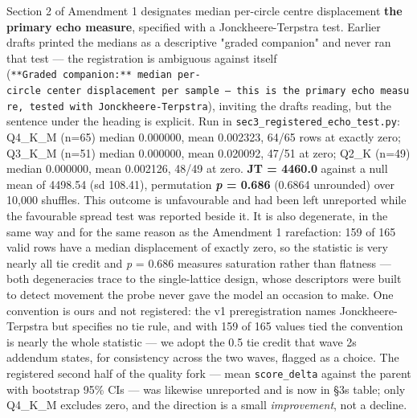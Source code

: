 Section 2 of Amendment 1 designates median per-circle centre displacement \textbf{the primary echo measure}, specified with a Jonckheere-Terpstra test. Earlier drafts printed the medians as a descriptive "graded companion" and never ran that test --- the registration is ambiguous against itself (\texttt{**Graded\ companion:**\ median\ per-circle\ center\ displacement\ per\ sample\ —\ this\ is\ the\ primary\ echo\ measure,\ tested\ with\ Jonckheere-Terpstra}), inviting the drafts\textquotesingle{} reading, but the sentence under the heading is explicit. Run in \texttt{sec3\_registered\_echo\_test.py}: Q4\_K\_M (n=65) median 0.000000, mean 0.002323, 64/65 rows at exactly zero; Q3\_K\_M (n=51) median 0.000000, mean 0.020092, 47/51 at zero; Q2\_K (n=49) median 0.000000, mean 0.002126, 48/49 at zero. \textbf{JT = 4460.0} against a null mean of 4498.54 (sd 108.41), permutation \textbf{\emph{p} = 0.686} (0.6864 unrounded) over 10,000 shuffles. This outcome is unfavourable and had been left unreported while the favourable spread test was reported beside it. It is also degenerate, in the same way and for the same reason as the Amendment 1 rarefaction: 159 of 165 valid rows have a median displacement of exactly zero, so the statistic is very nearly all tie credit and \emph{p} = 0.686 measures saturation rather than flatness --- both degeneracies trace to the single-lattice design, whose descriptors were built to detect movement the probe never gave the model an occasion to make. One convention is ours and not registered: the v1 preregistration names Jonckheere-Terpstra but specifies no tie rule, and with 159 of 165 values tied the convention is nearly the whole statistic --- we adopt the 0.5 tie credit that wave 2\textquotesingle s addendum states, for consistency across the two waves, flagged as a choice. The registered second half of the quality fork --- mean \texttt{score\_delta} against the parent with bootstrap 95\% CIs --- was likewise unreported and is now in §3\textquotesingle s table; only Q4\_K\_M excludes zero, and the direction is a small \emph{improvement}, not a decline.

